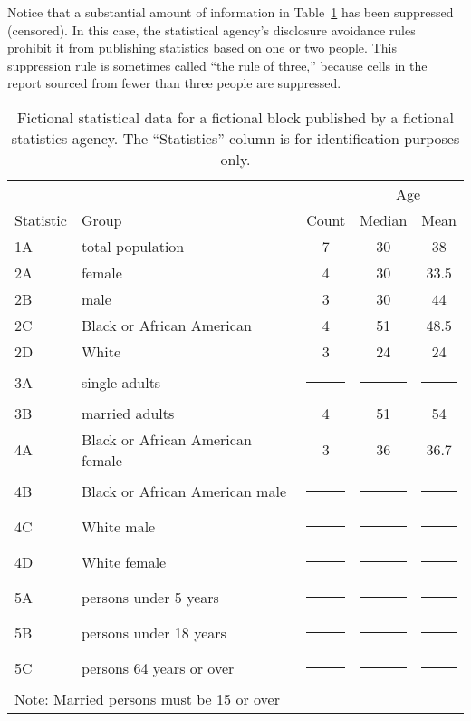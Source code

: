 \documentclass[runningheads]{llncs}
\begin{document}
Notice that a substantial amount of information in
Table~\ref{fictional} has been suppressed (censored). In this case,
the statistical agency's disclosure avoidance rules prohibit it from
publishing statistics based on one or two people. This suppression rule is
sometimes called ``the rule of three,'' because cells in the report
sourced from fewer than three people are suppressed.

\newcommand{\cens}{\multicolumn{1}{c|}{\rule{6mm}{3mm}}}
\begin{table}
\caption{Fictional statistical data for a fictional block published by
  a fictional statistics agency. The ``Statistics'' column is for identification
  purposes only.\label{fictional}}
\begin{center}
\begin{tabular}{l|l|c|c|c|}
          &                           &       & \multicolumn{2}{|c|}{Age} \\
Statistic & Group                     & Count & Median & Mean \\
\hline
       1A & total population          & 7     &  30    & 38 \\
\hline
       2A & female                    & 4     &  30    & 33.5 \\
       2B & male                      & 3     &  30    & 44 \\
       2C & Black or African American & 4     &  51    & 48.5 \\
       2D & White                     & 3     &  24    & 24 \\
\hline
       3A & single adults             & \cens & \cens  & \cens \\
       3B & married adults            & 4     & 51     & 54 \\
\hline
       4A & Black or African American female              & 3     & 36     & 36.7 \\
       4B & Black or African American male                & \cens & \cens  & \cens \\
       4C & White male                & \cens & \cens  & \cens \\
       4D & White female              & \cens & \cens  & \cens \\
\hline
       5A & persons under 5 years     & \cens & \cens  & \cens \\
       5B & persons under 18 years    & \cens & \cens  & \cens \\
       5C & persons 64 years or over  & \cens & \cens  & \cens \\
\hline
\multicolumn{5}{l}{Note: Married persons must be 15 or over}
\end{tabular}
\end{center}
\end{table}
\end{document}
